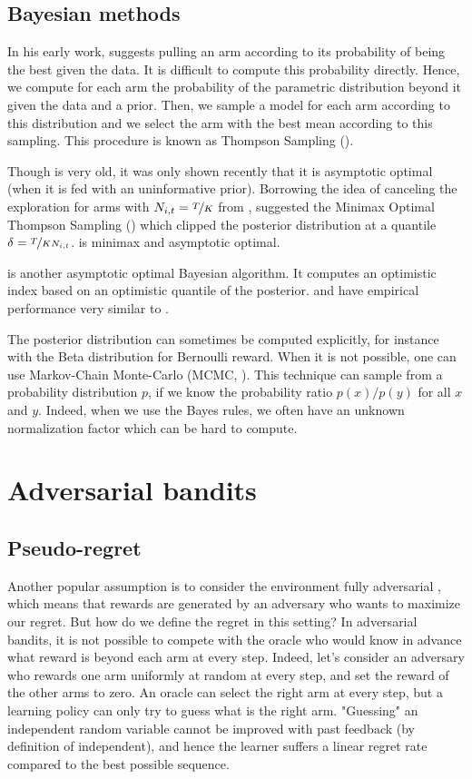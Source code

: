 {\subsection{Bayesian methods}
\label{ss:bayes}

In his early work, \citet{thompson1933likelihood} suggests pulling an arm according to its probability of being the best given the data. It is difficult to compute this probability directly. Hence, we compute for each arm the probability of the parametric distribution beyond it given the data and a prior. Then, we sample a model for each arm according to this distribution and we select the arm with the best mean according to this sampling. This procedure is known as Thompson Sampling (\TS).

Though \TS is very old, it was only shown recently \citep{kaufmann2012ts, agrawal2013finite} that it is asymptotic optimal (when it is fed with an uninformative prior). Borrowing the idea of canceling the exploration for arms with $N_{i,t} = \nicefrac{T}{K}$ from \MOSS, \citet{jin2020mots} suggested the Minimax Optimal Thompson Sampling (\MOTS) which clipped the posterior distribution at a quantile $\delta = \nicefrac{T}{KN_{i,t}}$. \MOTS is minimax and asymptotic optimal. 

\BayesUCB \citep{kaufmann2012bayesian} is another asymptotic optimal Bayesian algorithm. It computes an optimistic index based on an optimistic quantile of the posterior. \BayesUCB and \TS have empirical performance very similar to \KLUCB.

The posterior distribution can sometimes be computed explicitly, for instance with the Beta distribution for Bernoulli reward. When it is not possible, one can use Markov-Chain Monte-Carlo (MCMC, \citet{andrieu2003introduction}). This technique can sample from a probability distribution $p$, if we know the probability ratio $p(x)/p(y)$ for all $x$ and $y$. Indeed, when we use the Bayes rules, we often have an unknown normalization factor which can be hard to compute.
 

\section{Adversarial bandits}
\label{sec:adv-bandits}
\subsection{Pseudo-regret}
Another popular assumption is to consider the environment fully adversarial \citep{auer2002nonstochastic}, which means that rewards are generated by an adversary who wants to maximize our regret. But how do we define the regret in this setting? In adversarial bandits, it is not possible to compete with the oracle who would know in advance what reward is beyond each arm at every step. Indeed, let's consider an adversary who rewards one arm uniformly at random at every step, and set the reward of the other arms to zero. An oracle can select the right arm at every step, but a learning policy can only try to guess what is the right arm. "Guessing" an independent random variable cannot be improved with past feedback (by definition of independent), and hence the learner suffers a linear regret rate compared to the best possible sequence.

}
